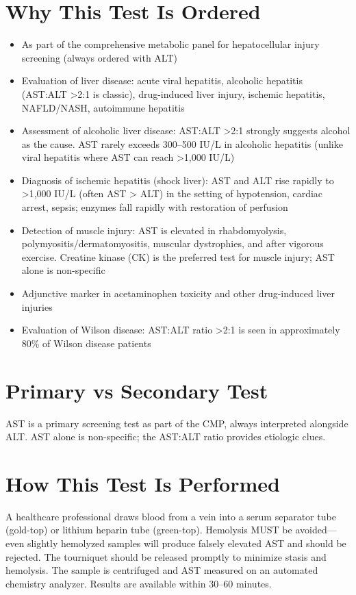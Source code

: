 \section*{Why This Test Is Ordered}
\begin{itemize}
  \item As part of the comprehensive metabolic panel for hepatocellular injury screening (always ordered with ALT)
  \item Evaluation of liver disease: acute viral hepatitis, alcoholic hepatitis (AST:ALT >2:1 is classic), drug-induced liver injury, ischemic hepatitis, NAFLD/NASH, autoimmune hepatitis
  \item Assessment of alcoholic liver disease: AST:ALT >2:1 strongly suggests alcohol as the cause. AST rarely exceeds 300--500 IU/L in alcoholic hepatitis (unlike viral hepatitis where AST can reach >1,000 IU/L)
  \item Diagnosis of ischemic hepatitis (shock liver): AST and ALT rise rapidly to >1,000 IU/L (often AST > ALT) in the setting of hypotension, cardiac arrest, sepsis; enzymes fall rapidly with restoration of perfusion
  \item Detection of muscle injury: AST is elevated in rhabdomyolysis, polymyositis/dermatomyositis, muscular dystrophies, and after vigorous exercise. Creatine kinase (CK) is the preferred test for muscle injury; AST alone is non-specific
  \item Adjunctive marker in acetaminophen toxicity and other drug-induced liver injuries
  \item Evaluation of Wilson disease: AST:ALT ratio >2:1 is seen in approximately 80\% of Wilson disease patients
\end{itemize}

\section*{Primary vs Secondary Test}
AST is a primary screening test as part of the CMP, always interpreted alongside ALT. AST alone is non-specific; the AST:ALT ratio provides etiologic clues.

\section*{How This Test Is Performed}
A healthcare professional draws blood from a vein into a serum separator tube (gold-top) or lithium heparin tube (green-top). Hemolysis MUST be avoided---even slightly hemolyzed samples will produce falsely elevated AST and should be rejected. The tourniquet should be released promptly to minimize stasis and hemolysis. The sample is centrifuged and AST measured on an automated chemistry analyzer. Results are available within 30--60 minutes.

